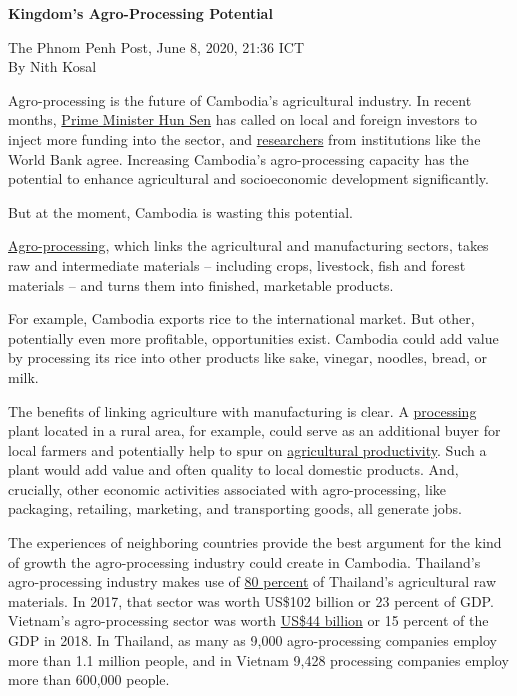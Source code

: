 \documentclass[10pt,a4paper]{letter}
\begin{document}
	
{\Large 
	\textbf{Kingdom's Agro-Processing Potential}
} 

The Phnom Penh Post, June 8, 2020, 21:36 ICT \\
By Nith Kosal

Agro-processing is the future of Cambodia's agricultural industry. In recent months, \href{https://www.khmertimeskh.com/50686215/demand-to-modernise-agriculture}{Prime Minister Hun Sen} has called on local and foreign investors to inject more funding into the sector, and \href{https://www.worldbank.org/en/country/cambodia/publication/cambodian-agriculture-in-transition-opportunities-and-risks}{researchers} from institutions like the World Bank agree. Increasing Cambodia's agro-processing capacity has the potential to enhance agricultural and socioeconomic development significantly.

But at the moment, Cambodia is wasting this potential. 

\href{https://www.agriculturenigeria.com/processing/agro-processing/}{Agro-processing}, which links the agricultural and manufacturing sectors, takes raw and intermediate materials -- including crops, livestock, fish and forest materials -- and turns them into finished, marketable products.

For example, Cambodia exports rice to the international market. But other, potentially even more profitable, opportunities exist. Cambodia could add value by processing its rice into other products like sake, vinegar, noodles, bread, or milk.

The benefits of linking agriculture with manufacturing is clear. A \href{https://www.researchgate.net/publication/323749975_Structural_transformation_in_agriculture_and_agro-processing_value_chains}{processing} plant located in a rural area, for example, could serve as an additional buyer for local farmers and potentially help to spur on \href{http://acetforafrica.org/acet/wp-content/uploads/publications/2017/10/ATR17-overview-english-for-web-0911.pdf}{agricultural productivity}. Such a plant would add value and often quality to local domestic products. And, crucially, other economic activities associated with agro-processing, like packaging, retailing, marketing, and transporting goods, all generate jobs.

The experiences of neighboring countries provide the best argument for the kind of growth the agro-processing industry could create in Cambodia. Thailand's agro-processing industry makes use of \href{http://www.boi.go.th/upload/content/Food%20industry_5aa7b40bd758b.pdf}{80 percent} of Thailand's agricultural raw materials. In 2017, that sector was worth US\$102 billion or 23 percent of GDP. Vietnam's agro-processing sector was worth \href{https://www.fas.usda.gov/data/vietnam-food-processing-ingredients-2}{US\$44 billion} or 15 percent of the GDP in 2018. In Thailand, as many as 9,000 agro-processing companies employ more than 1.1 million people, and in Vietnam 9,428 processing companies employ more than 600,000 people.
\end{document}
